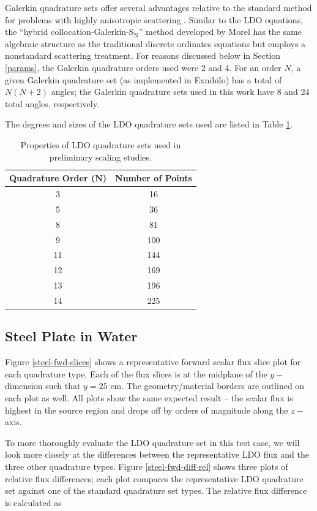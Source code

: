 Galerkin quadrature sets offer several advantages relative to the standard \sn method
for problems with highly anisotropic scattering \cite{morel}. Similar to the LDO
equations, the ``hybrid collocation-Galerkin-S$_\mathrm{N}$'' method developed by 
Morel has the same algebraic structure as the traditional discrete ordinates 
equations but employs a nonstandard scattering treatment.
For reasons discussed below in Section \ref{params}, the Galerkin quadrature orders
used were 2 and 4. For an \sn order $N$, a given Galerkin quadrature set (as
implemented in Exnihilo) has a total of $N(N+2)$ angles; the Galerkin quadrature sets
used in this work have 8 and 24 total angles, respectively.

The degrees and sizes of the LDO quadrature sets used are listed in Table
\ref{ldo-n}.

\begin{table}[!htb]
\centering
\caption{Properties of LDO quadrature sets used in preliminary scaling studies.}
\begin{tabular}{cc}
\multicolumn{1}{l}{\textbf{Quadrature Order ($\mathbf{N}$)}} & 
\multicolumn{1}{l}{\textbf{Number of Points}} \\
\hline
3 & 16 \\
5 & 36 \\
8 & 81 \\
9 & 100 \\
11 & 144 \\
12 & 169 \\
13 & 196 \\
14 & 225 \\
\end{tabular}
\label{ldo-n}
\end{table}

\FloatBarrier
\subsection{Steel Plate in Water}
\label{sec:steel-fwd}

Figure \ref{steel-fwd-slices} shows a representative forward scalar flux slice plot 
for each quadrature type. Each of the flux slices is at the midplane of the 
$y-$dimension such that $y = 25$ cm. The geometry/material borders are outlined on
each plot as well. All plots show the same expected result -- the scalar flux is 
highest in the source region and drops off by orders of magnitude along the $z-$axis.

To more thoroughly evaluate the LDO quadrature set in this test case, we will look 
more closely at the differences between the representative LDO flux and the three
other quadrature types. Figure \ref{steel-fwd-diff-rel} shows three plots of relative
flux differences; each plot compares the representative LDO quadrature set against one
of the standard quadrature set types. The relative flux difference is calculated as


